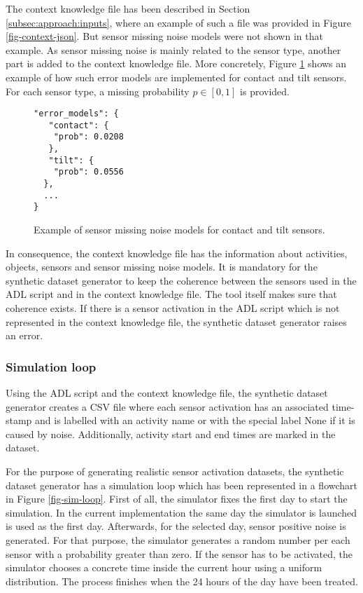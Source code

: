 The context knowledge file has been described in Section \ref{subsec:approach:inputs}, where an example of such a file was provided in Figure \ref{fig-context-json}. But sensor missing noise models were not shown in that example. As sensor missing noise is mainly related to the sensor type, another part is added to the context knowledge file. More concretely, Figure \ref{fig-missing-noise} shows an example of how such error models are implemented for contact and tilt sensors. For each sensor type, a missing probability $p \in [0, 1]$ is provided. 

\begin{figure}[htbp]
\begin{small}
\begin{lstlisting}
"error_models": {
   "contact": {
	"prob": 0.0208
   },
   "tilt": {
	"prob": 0.0556
  },
  ...
}
\end{lstlisting}
\end{small}
\caption{Example of sensor missing noise models for contact and tilt sensors.}
\label{fig-missing-noise}
\end{figure}

In consequence, the context knowledge file has the information about activities, objects, sensors and sensor missing noise models. It is mandatory for the synthetic dataset generator to keep the coherence between the sensors used in the ADL script and in the context knowledge file. The tool itself makes sure that coherence exists. If there is a sensor activation in the ADL script which is not represented in the context knowledge file, the synthetic dataset generator raises an error.

\subsubsection*{Simulation loop}

Using the ADL script and the context knowledge file, the synthetic dataset generator creates a CSV file where each sensor activation has an associated time-stamp and is labelled with an activity name or with the special label None if it is caused by noise. Additionally, activity start and end times are marked in the dataset.

For the purpose of generating realistic sensor activation datasets, the synthetic dataset generator has a simulation loop which has been represented in a flowchart in Figure \ref{fig-sim-loop}. First of all, the simulator fixes the first day to start the simulation. In the current implementation the same day the simulator is launched is used as the first day. Afterwards, for the selected day, sensor positive noise is generated. For that purpose, the simulator generates a random number per each sensor with a probability greater than zero. If the sensor has to be activated, the simulator chooses a concrete time inside the current hour using a uniform distribution. The process finishes when the 24 hours of the day have been treated.

